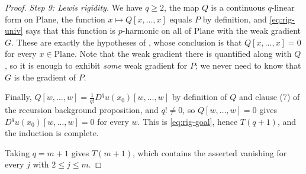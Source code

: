 \begin{proof}
\emph{Step 9: Lewis rigidity.}  We have $q\ge2$, the map $Q$ is a continuous $q$-linear form on
$\mathrm{Plane}$, the function $x\mapsto Q[x,\ldots,x]$ equals $P$ by definition, and
\eqref{eq:rig-univ} says that this function is $p$-harmonic on all of $\mathrm{Plane}$ with the
weak gradient $G$.  These are exactly the hypotheses of , whose
conclusion is that $Q[x,\ldots,x]=0$ for every $x\in\mathrm{Plane}$.  Note that the weak
gradient there is quantified along with $Q$, so it is enough to exhibit \emph{some} weak
gradient for $P$; we never need to know that $G$ is the gradient of $P$.

Finally, $Q[w,\ldots,w]=\tfrac1{q!}D^{q}u(x_0)[w,\ldots,w]$ by definition of $Q$ and clause (7)
of the recursion background proposition, and $q!\neq0$, so $Q[w,\ldots,w]=0$ gives
$D^{q}u(x_0)[w,\ldots,w]=0$ for every $w$.  This is \eqref{eq:rig-goal}, hence $T(q+1)$, and the
induction is complete.

\medskip\noindent Taking $q=m+1$ gives $T(m+1)$, which contains the asserted vanishing for every
$j$ with $2\le j\le m$.
\end{proof}
